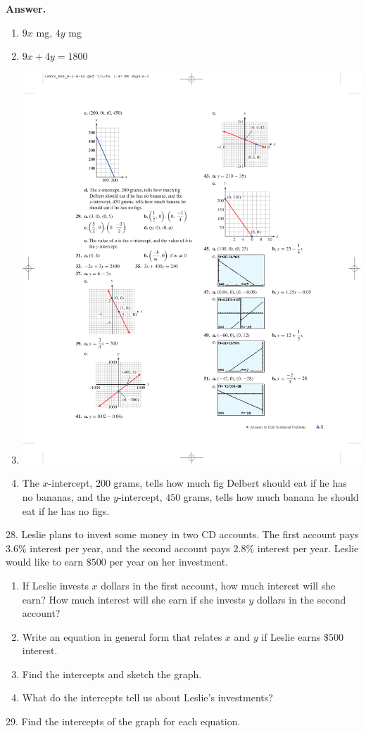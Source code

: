 \documentclass[10pt,]{book}
\theoremstyle{plain}
\theoremstyle{definition}
\theoremstyle{definition}
\theoremstyle{definition}
\numberwithin{equation}{part}
\begin{document}
\begin{exerciselist}
\noindent\textbf{Answer.}\hypertarget{answer-21}{}\quad
\leavevmode%
\begin{enumerate}[label=\alph*]
\item\hypertarget{li-195}{}\(9x\) mg, \(4y\) mg%
\item\hypertarget{li-196}{}\(9x + 4y = 1800\)%
\item\hypertarget{li-197}{}\includegraphics[width=0.35\linewidth]{images/fig-ans-1-1-27}
%
\item\hypertarget{li-198}{}The \(x\)-intercept, \(200\) grams, tells how much fig Delbert should eat if he has no bananas, and the \(y\)-intercept, \(450\) grams, tells how much banana he should eat if he has no figs.%
\end{enumerate}
%
\item[28.]\hypertarget{exercise-35}{}Leslie plans to invest some money in two CD accounts. The first account pays \(3.6\%\) interest per year, and the second account pays \(2.8\%\) interest per year. Leslie would like to earn \(\$500\) per year on her investment.%
\leavevmode%
\begin{enumerate}[label=\alph*]
\item\hypertarget{li-199}{}If Leslie invests \(x\) dollars in the first account, how much interest will she earn? How much interest will she earn if she invests \(y\) dollars in the second account?%
\item\hypertarget{li-200}{}Write an equation in general form that relates \(x\) and \(y\) if Leslie earns \(\$500\) interest.%
\item\hypertarget{li-201}{}Find the intercepts and sketch the graph.%
\item\hypertarget{li-202}{}What do the intercepts tell us about Leslie's investments?%
\end{enumerate}
\par\smallskip
\item[29.]\hypertarget{exercise-36}{}Find the intercepts of the graph for each equation.%
\leavevmode%
\begin{multicols}{2}

\end{multicols}
\end{exerciselist}
\end{document}
